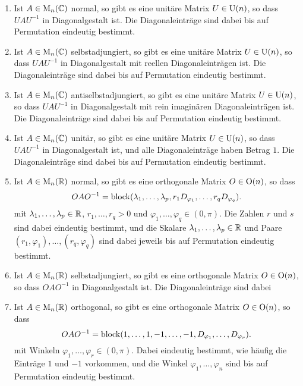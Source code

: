 \documentclass[a4paper, 10pt, numbers=noenddot]{scrartcl}
\begin{document}
\begin{theorem}
  \begin{enumerate}[leftmargin=*]
    \item
      Ist $A \in \operatorname{M}_n(\mathbb{C})$ normal, so gibt es eine unitäre Matrix $U \in \operatorname{U}(n)$, so dass $U \! A U^{-1}$ in Diagonalgestalt ist.
      Die Diagonaleinträge sind dabei bis auf Permutation eindeutig bestimmt.
    \item
      Ist $A \in \operatorname{M}_n(\mathbb{C})$ selbstadjungiert, so gibt es eine unitäre Matrix $U \in \operatorname{U}(n)$, so dass $U \! A U^{-1}$ in Diagonalgestalt mit reellen Diagonaleinträgen ist.
      Die Diagonaleinträge sind dabei bis auf Permutation eindeutig bestimmt.
    \item
      Ist $A \in \operatorname{M}_n(\mathbb{C})$ antiselbstadjungiert, so gibt es eine unitäre Matrix $U \in \operatorname{U}(n)$, so dass $U \! A U^{-1}$ in Diagonalgestalt mit rein imaginären Diagonaleinträgen ist.
      Die Diagonaleinträge sind dabei bis auf Permutation eindeutig bestimmt.
    \item
      Ist $A \in \operatorname{M}_n(\mathbb{C})$ unitär, so gibt es eine unitäre Matrix $U \in \operatorname{U}(n)$, so dass $U \! A U^{-1}$ in Diagonalgestalt ist, und alle Diagonaleinträge haben Betrag $1$.
      Die Diagonaleinträge sind dabei bis auf Permutation eindeutig bestimmt.
    \item
      Ist $A \in \operatorname{M}_n(\mathbb{R})$ normal, so gibt es eine orthogonale Matrix $O \in \operatorname{O}(n)$, so dass
      \[
          O A O^{-1}
        = \operatorname{\operatorname{block}}(\lambda_1, \dotsc, \lambda_p, r_1 D_{\varphi_1}, \dotsc, r_q D_{\varphi_q}).
      \]
      mit $\lambda_1, \dotsc, \lambda_p \in \mathbb{R}$, $r_1, \dotsc, r_q > 0$ und $\varphi_1, \dotsc, \varphi_q \in (0,\pi)$.
      Die Zahlen $r$ und $s$ sind dabei eindeutig bestimmt, und die Skalare $\lambda_1, \dotsc, \lambda_p \in \mathbb{R}$ und Paare $(r_1, \varphi_1), \dotsc, (r_q, \varphi_q)$ sind dabei jeweils bis auf Permutation eindeutig bestimmt.
    \item
      Ist $A \in \operatorname{M}_n(\mathbb{R})$ selbstadjungiert, so gibt es eine orthogonale Matrix $O \in \operatorname{O}(n)$, so dass $O A O^{-1}$ in Diagonalgestalt ist.
      Die Diagonaleinträge sind dabei
    \item
      Ist $A \in \operatorname{M}_n(\mathbb{R})$ orthogonal, so gibt es eine orthogonale Matrix $O \in \operatorname{O}(n)$, so dass
      \[
          O A O^{-1}
        = \operatorname{\operatorname{block}}(1, \dotsc, 1, -1, \dotsc, -1, D_{\varphi_1}, \dotsc, D_{\varphi_r}).
      \]
      mit Winkeln $\varphi_1, \dotsc, \varphi_r \in (0,\pi)$.
      Dabei eindeutig bestimmt, wie häufig die Einträge $1$ und $-1$ vorkommen, und die Winkel $\varphi_1, \dotsc, \varphi_n$ sind bis auf Permutation eindeutig bestimmt.
  \end{enumerate}
\end{theorem}
\end{document}
